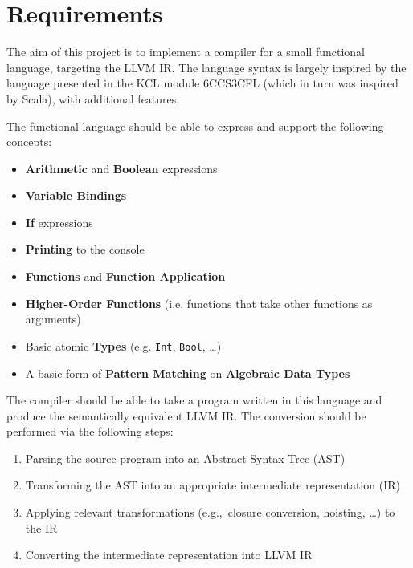 \chapter{Requirements}

The aim of this project is to implement a compiler for a small functional language, targeting the
LLVM IR. The language syntax is largely inspired by the language presented in the KCL module
6CCS3CFL (which in turn was inspired by Scala), with additional features.

The functional language should be able to express and support the following concepts:

\begin{itemize}
    \onehalfspacing
    \item \textbf{Arithmetic} and \textbf{Boolean} expressions
    \item \textbf{Variable Bindings}
    \item \textbf{If} expressions
    \item \textbf{Printing} to the console
    \item \textbf{Functions} and \textbf{Function Application}
    \item \textbf{Higher-Order Functions} (i.e. functions that take other functions as arguments)
    \item Basic atomic \textbf{Types} (e.g. \texttt{Int}, \texttt{Bool},
          \dots)
    \item A basic form of \textbf{Pattern Matching} on \textbf{Algebraic Data Types}
\end{itemize}

The compiler should be able to take a program written in this language and produce the semantically
equivalent LLVM IR. The conversion should be performed via the following steps:

\begin{enumerate}
    \onehalfspacing
    \item Parsing the source program into an Abstract Syntax Tree (AST)
    \item Transforming the AST into an appropriate intermediate representation (IR)
    \item Applying relevant transformations (e.g.,\ closure conversion, hoisting, \dots) to
          the IR
    \item Converting the intermediate representation into LLVM IR
\end{enumerate}

